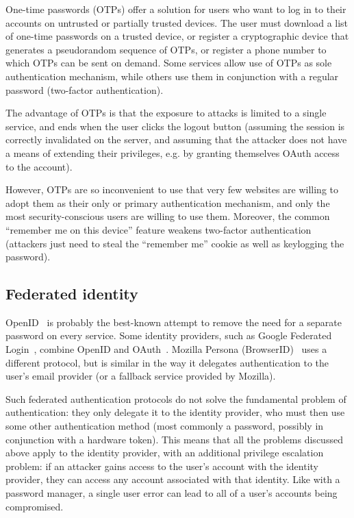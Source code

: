 One-time passwords (OTPs) offer a solution for users who want to log in to their accounts on
untrusted or partially trusted devices. The user must download a list of one-time passwords on a
trusted device, or register a cryptographic device that generates a pseudorandom sequence of OTPs,
or register a phone number to which OTPs can be sent on demand. Some services allow use of OTPs as
sole authentication mechanism, while others use them in conjunction with a regular password
(two-factor authentication).

The advantage of OTPs is that the exposure to attacks is limited to a single service, and ends when
the user clicks the logout button (assuming the session is correctly invalidated on the server, and
assuming that the attacker does not have a means of extending their privileges, e.g. by granting
themselves OAuth access to the account).

However, OTPs are so inconvenient to use that very few websites are willing to adopt them as their
only or primary authentication mechanism, and only the most security-conscious users are willing to
use them. Moreover, the common ``remember me on this device'' feature weakens two-factor
authentication (attackers just need to steal the ``remember me'' cookie as well as keylogging the
password).

\subsection{Federated identity}

OpenID~\cite{OpenID} is probably the best-known attempt to remove the need for a separate password
on every service. Some identity providers, such as Google Federated Login~\cite{GoogleOpenID},
combine OpenID and OAuth~\cite{OAuth}. Mozilla Persona (BrowserID)~\cite{Persona, BrowserID} uses a
different protocol, but is similar in the way it delegates authentication to the user's email
provider (or a fallback service provided by Mozilla).

Such federated authentication protocols do not solve the fundamental problem of authentication: they
only delegate it to the identity provider, who must then use some other authentication method (most
commonly a password, possibly in conjunction with a hardware token). This means that all the
problems discussed above apply to the identity provider, with an additional privilege escalation
problem: if an attacker gains access to the user's account with the identity provider, they can
access any account associated with that identity. Like with a password manager, a single user error
can lead to all of a user's accounts being compromised.

